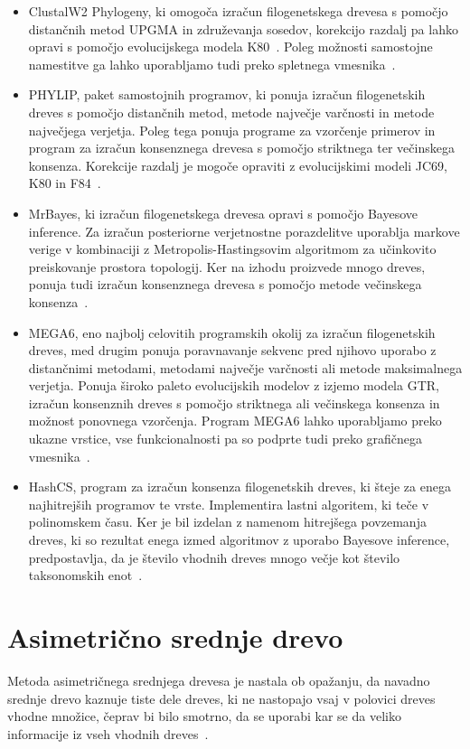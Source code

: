 \documentclass[a4paper, 12pt]{book}
\begin{document}
\begin{itemize}
	\item ClustalW2 Phylogeny, ki omogoča izračun filogenetskega drevesa s 
		 po\-moč\-jo distančnih metod UPGMA in združevanja sosedov, korekcijo 
		 razdalj pa lahko opravi s pomočjo evolucijskega modela K80~\cite{clustalw2}. 
	      Poleg možnosti samostojne namestitve ga lahko uporabljamo tudi 
	      preko spletnega vmesnika~\cite{clustalw2_phylogeny}.
	\item PHYLIP, paket samostojnih programov, ki ponuja izračun filogenetskih dreves 
		  s pomočjo distančnih metod, metode največje varčnosti in metode največjega 
		  verjetja. Poleg tega ponuja programe za vzorčenje primerov in program
	      za izračun konsenznega drevesa s pomočjo striktnega ter večinskega konsenza. 
	      Korekcije razdalj je mogoče opraviti z evolucijskimi modeli JC69, K80 in F84~\cite{phylip}.
	\item MrBayes, ki izračun filogenetskega drevesa opravi s pomočjo Bayesove inference. 
		  Za izračun posteriorne verjetnostne porazdelitve uporablja markove verige v 
		  kombinaciji z Metropolis-Hastingsovim algoritmom za učinkovito preiskovanje 
	      prostora topologij. Ker na izhodu proizvede mnogo dreves, ponuja tudi 
	      izračun konsenznega drevesa s pomočjo metode večinskega konsenza~\cite{mrbayes}.
	\item MEGA6, eno najbolj celovitih programskih okolij za izračun filogenetskih 
		  dreves, med drugim ponuja poravnavanje sekvenc pred njihovo uporabo z 
		  distančnimi metodami, metodami največje varčnosti ali metode maksimalnega
	       verjetja. Ponuja široko paleto evolucijskih modelov z izjemo modela GTR, 
	       izračun konsenznih dreves s pomočjo striktnega ali večinskega konsenza 
	       in možnost ponovnega vzorčenja. Program MEGA6 lahko uporabljamo preko ukazne
	       vrstice, vse funkcionalnosti pa so podprte tudi preko grafičnega vmesnika~\cite{mega6}. 
	\item HashCS, program za izračun konsenza filogenetskih dreves, ki šteje za 
		  enega najhitrejših programov te vrste. Implementira lastni algoritem, ki 
		  teče v polinomskem času. Ker je bil izdelan z namenom hitrejšega povzemanja 
		  dreves, ki so rezultat enega izmed algoritmov z uporabo Bayesove inference, 
		  predpostavlja, da je število vhodnih dreves mnogo večje kot število 
		  taksonomskih enot~\cite{hashcs}.
\end{itemize} 

\chapter{Asimetrično srednje drevo}
Metoda asimetričnega srednjega drevesa je nastala ob opažanju, da navadno srednje 
drevo kaznuje tiste dele dreves, ki ne nastopajo vsaj v polovici dreves vhodne množice, 
čeprav bi bilo smotrno, da se uporabi kar se da veliko informacije iz vseh vhodnih 
dreves~\cite{pw}.
\end{document}
